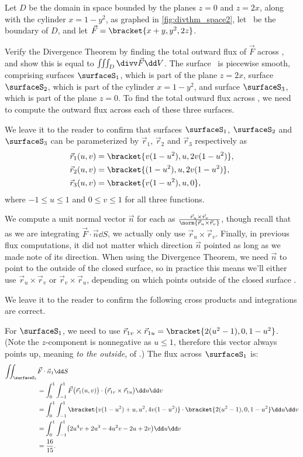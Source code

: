 \begin{example}\label{ex_divthm_space2}
Let $D$ be the domain in space bounded by the planes $z=0$ and $z=2x$, along with the cylinder $x=1-y^2$, as graphed in \autoref{fig:divthm_space2}, let \surfaceS\ be the boundary of $D$, and let $\vec F =\bracket{x+y,y^2, 2z}$. 

Verify the Divergence Theorem by finding the total outward flux of $\vec F$ across \surfaceS, and show this is equal to $\iiint_D \divv\vec F\dd V$.
\solution
The surface \surfaceS\ is piecewise smooth, comprising surfaces $\surfaceS_1$, which is part of the plane $z=2x$, surface $\surfaceS_2$, which is part of the cylinder $x=1-y^2$, and surface $\surfaceS_3$, which is part of the plane $z=0$. To find the total outward flux across \surfaceS, we need to compute the outward flux across each of these three surfaces.

We leave it to the reader to confirm that surfaces $\surfaceS_1$, $\surfaceS_2$ and $\surfaceS_3$ can be parameterized by $\vec r_1$, $\vec r_2$ and $\vec r_3$ respectively as
\begin{align*}
\vec r_1(u,v) &=\bracket{v(1-u^2), u, 2v(1-u^2)}, \\
\vec r_2(u,v) &=\bracket{(1-u^2), u, 2v(1-u^2)},\\
\vec r_3(u,v) &=\bracket{v(1-u^2), u, 0},
\end{align*}
where $-1\leq u\leq 1$ and $0\leq v\leq 1$ for all three functions.

We compute a unit normal vector $\vec n$ for each as $\frac{\vec r_u\times\vec r_v}{\norm{\vec r_u\times\vec r_v}}$, though recall that as we are integrating $\vec F\cdot \vec n\dd S$, we actually only use $\vec r_u\times\vec r_v$. Finally, in previous flux computations, it did not matter which direction $\vec n$ pointed as long as we made note of its direction. When using the Divergence Theorem, we need $\vec n$ to point to the outside of the closed surface, so in practice this means we'll either use $\vec r_u\times\vec r_v$ or $\vec r_v\times\vec r_u$, depending on which points outside of the closed surface \surfaceS.

We leave it to the reader to confirm the following cross products and integrations are correct.

For $\surfaceS_1$, we need to use $\vec r_{1v}\times\vec r_{1u} =\bracket{2(u^2-1),0,1-u^2}$. (Note the $z$-component is nonnegative as $u\leq 1$, therefore this vector always points up, meaning \emph{to the outside}, of \surfaceS.) The flux across $\surfaceS_1$ is:
\begin{align*}
	\iint_{\surfaceS_1} &\vec F\cdot \vec n_1\dd S
	 \\
	&= \int_0^1\int_{-1}^1 \vec F\bigl(\vec r_1(u,v)\bigr)\cdot \bigl(\vec r_{1v}\times\vec r_{1u}\bigr)\dd u\dd v\\
	&= \int_0^1\int_{-1}^1\bracket{v(1-u^2)+u, u^2,4v(1-u^2)}\cdot\bracket{2(u^2-1),0,1-u^2}\dd u\dd v\\
	&= \int_0^1\int_{-1}^1 \bigl(2u^4v+2u^3-4u^2v-2u+2v\bigr)\dd u\dd v\\
	&= \frac{16}{15}.
\end{align*}


\end{example}
